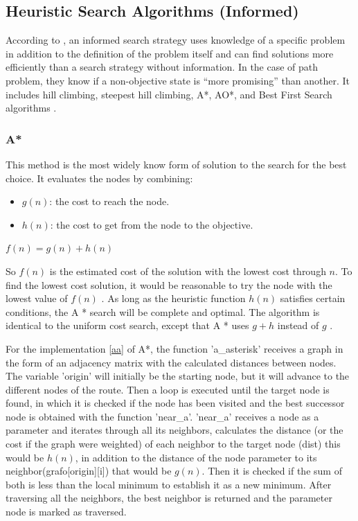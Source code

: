 \documentclass[12pt]{article}
\begin{document}
    \subsection{Heuristic Search Algorithms (Informed)}
    According to \cite{russell2004inteligencia}, an informed search strategy uses knowledge of a specific problem in addition to the definition of the problem itself and can find solutions more efficiently than a search strategy without information. In the case of path problem, they know if a non-objective state is “more promising” than another. It includes hill climbing, steepest hill climbing, A*, AO*, and Best First Search algorithms \cite{Maharshi2018ComparativeAO}.
        \subsubsection{A*}
        This method is the most widely know form of solution to the search for the best choice.
        It evaluates the nodes by combining:
        \begin{itemize}
            \item $g(n)$: the cost to reach the node. 
            \item $h(n)$: the cost to get from the node to the objective.
        \end{itemize}
        \begin{center}
            $f(n) = g(n) + h(n)$
        \end{center}
        So $f(n)$ is the estimated cost of the solution with the lowest cost through $n$.
        To find the lowest cost solution, it would be reasonable to try the node with the lowest value of $f(n)$ . As long as the heuristic function $h(n)$ satisfies certain conditions, the A * search will be complete and optimal. The algorithm is identical to the uniform cost search, except that A * uses $g + h$ instead of $g$ \cite{russell2004inteligencia}.
        
        For the implementation \ref{aa} of A*, the function 'a\_asterisk' receives a graph in the form of an adjacency matrix with the calculated distances between nodes.
        The variable 'origin' will initially be the starting node, but it will advance to the different nodes of the route. Then a loop is executed until the target node is found, in which it is checked if the node has been visited and the best successor node is obtained with the function 'near\_a'. 
        'near\_a' receives a node as a parameter and iterates through all its neighbors, calculates the distance (or the cost if the graph were weighted) of each neighbor to the target node (dist) this would be $h(n)$, in addition to the distance of the node parameter to its neighbor(grafo[origin][i]) that would be $g(n)$. Then it is checked if the sum of both is less than the local minimum to establish it as a new minimum. After traversing all the neighbors, the best neighbor is returned and the parameter node is marked as traversed.
        
\end{document}
